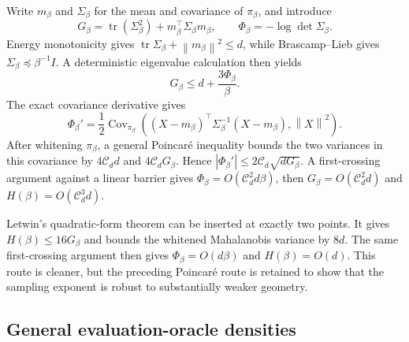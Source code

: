 \documentclass[11pt]{article}
\theoremstyle{remark}
\newcommand{\1}{\bm 1}
\newcommand{\Cov}{\operatorname{Cov}}
\newcommand{\tr}{\operatorname{tr}}
\newcommand{\norm}[1]{\left\lVert #1\right\rVert}
\newcommand{\abs}[1]{\left|#1\right|}
\begin{document}
Write $m_\beta$ and $\Sigma_\beta$ for the mean and covariance of
$\pi_\beta$, and introduce
\begin{equation}\label{eq:intro-potentials}
  G_\beta=\tr(\Sigma_\beta^2)
     +m_\beta^\top\Sigma_\beta m_\beta,
  \qquad
  \Phi_\beta=-\log\det\Sigma_\beta.
\end{equation}
Energy monotonicity gives
$\tr\Sigma_\beta+\norm{m_\beta}^2\leq d$, while Brascamp--Lieb gives
$\Sigma_\beta\preceq\beta^{-1}I$.  A deterministic eigenvalue
calculation then yields
\begin{equation}\label{eq:intro-G-Phi}
  G_\beta\leq d+\frac{3\Phi_\beta}{\beta}.
\end{equation}
The exact covariance derivative gives
\[
  \Phi_\beta'
  =\frac12\Cov_{\pi_\beta}\!\left(
      (X-m_\beta)^\top\Sigma_\beta^{-1}(X-m_\beta),
      \norm X^2
    \right).
\]
After whitening $\pi_\beta$, a general Poincar\'e inequality bounds the
two variances in this covariance by
$4\mathcal C_dd$ and $4\mathcal C_dG_\beta$.  Hence
$\abs{\Phi_\beta'}\leq2\mathcal C_d\sqrt{dG_\beta}$.  A first-crossing
argument against a linear barrier gives
$\Phi_\beta=O(\mathcal C_d^2d\beta)$, then
$G_\beta=O(\mathcal C_d^2d)$ and
$H(\beta)=O(\mathcal C_d^3d)$.

Letwin's quadratic-form theorem can be inserted at exactly two points.
It gives $H(\beta)\leq16G_\beta$ and bounds the whitened Mahalanobis
variance by $8d$.  The same first-crossing argument then gives
$\Phi_\beta=O(d\beta)$ and $H(\beta)=O(d)$.  This route is cleaner, but
the preceding Poincar\'e route is retained to show that the sampling
exponent is robust to substantially weaker geometry.

\subsection{General evaluation-oracle densities}
\end{document}
